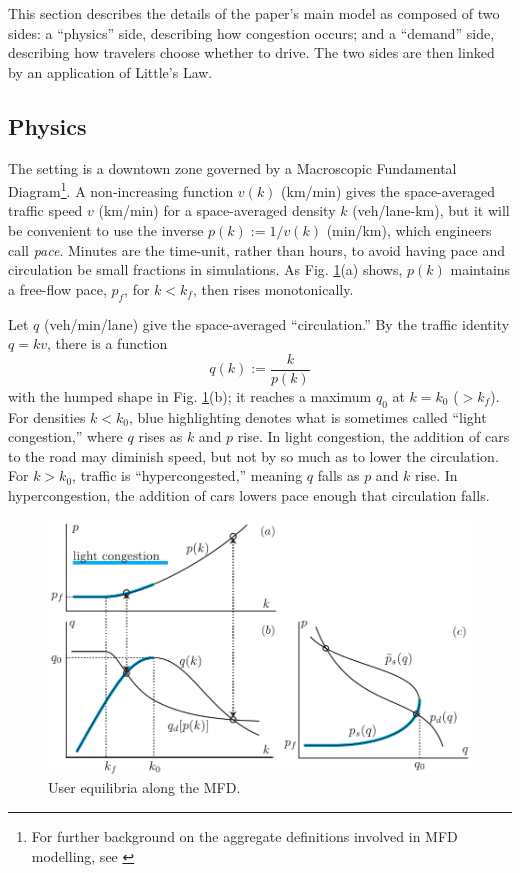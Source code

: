 \documentclass[preprint,authoryear]{elsarticle}
\begin{document}
This section describes the details of the paper's main model as composed of two sides: a ``physics'' side, describing how congestion occurs; and a ``demand'' side, describing how travelers choose whether to drive. The two sides are then linked by an application of Little's Law.

\subsection{Physics}
\label{ssec:physics}

The setting is a downtown zone governed by a Macroscopic Fundamental Diagram\footnote{For further background on the aggregate definitions involved in MFD modelling, see \citet{Daganzo2007}}. A non-increasing function $v(k)$ (km/min) gives the space-averaged traffic speed $v$ (km/min) for a space-averaged density $k$ (veh/lane-km), but it will be convenient to use the inverse $p(k):=1/v(k)$ (min/km), which engineers call \emph{pace}. Minutes are the time-unit, rather than hours, to avoid having pace and circulation be small fractions in simulations. As Fig. \ref{fig:ue}(a) shows, $p(k)$ maintains a free-flow pace, $p_f$, for $k<k_f$, then rises monotonically.

Let $q$ (veh/min/lane) give the space-averaged ``circulation.'' By the traffic identity $q=kv$, there is a function
\begin{equation}
	q(k) := \frac{k}{p(k)}
\end{equation}
with the humped shape in Fig. \ref{fig:ue}(b); it reaches a maximum $q_0$ at $k=k_0$ ($>k_f$). For densities $k<k_0$, blue highlighting denotes what is sometimes called ``light congestion,'' where $q$ rises as $k$ and $p$ rise. In light congestion, the addition of cars to the road may diminish speed, but not by so much as to lower the circulation. For $k>k_0$, traffic is ``hypercongested,'' meaning $q$ falls as $p$ and $k$ rise. In hypercongestion, the addition of cars lowers pace enough that circulation falls.

\begin{figure}
	\centering
	\includegraphics[width=1\textwidth]{img/equilibrium-k}
	\caption{User equilibria along the MFD.}
	\label{fig:ue}
\end{figure}
\end{document}
